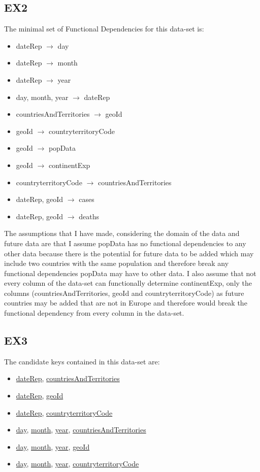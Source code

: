 \documentclass[10pt]{article}
\begin{document}
\subsection{EX2}
The minimal set of Functional Dependencies for this data-set is:
\begin{itemize}
  \item dateRep $\rightarrow$ day
  \item dateRep $\rightarrow$ month
  \item dateRep $\rightarrow$ year
  \item day, month, year $\rightarrow$ dateRep
  \item countriesAndTerritories $\rightarrow$ geoId
  \item geoId $\rightarrow$ countryterritoryCode
  \item geoId $\rightarrow$ popData
  \item geoId $\rightarrow$ continentExp
  \item countryterritoryCode $\rightarrow$ countriesAndTerritories
  \item dateRep, geoId $\rightarrow$ cases
  \item dateRep, geoId $\rightarrow$ deaths
\end{itemize}
The assumptions that I have made, considering the domain of the data and future data are that I assume popData has no functional dependencies to any other data because there is the potential for future data to be added which may include two countries with the same population and therefore break any functional dependencies popData may have to other data.
I also assume that not every column of the data-set can functionally determine continentExp, only the columns (countriesAndTerritories, geoId and countryterritoryCode) as future countries may be added that are not in Europe and therefore would break the functional dependency from every column in the data-set.



\subsection{EX3}
The candidate keys contained in this data-set are:
\begin{itemize}
    \item \underline{dateRep}, \underline{countriesAndTerritories}
    \item \underline{dateRep}, \underline{geoId}
    \item \underline{dateRep}, \underline{countryterritoryCode}
    \item \underline{day}, \underline{month}, \underline{year}, \underline{countriesAndTerritories}
    \item \underline{day}, \underline{month}, \underline{year}, \underline{geoId}
    \item \underline{day}, \underline{month}, \underline{year}, \underline{countryterritoryCode}
\end{itemize}
\end{document}

